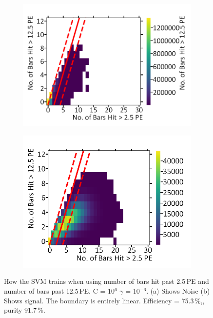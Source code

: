 \begin{figure}[!h]
\centering
\begin{subfigure}{.5\textwidth}
  \centering
  \includegraphics[width=\linewidth]{Appendix1/Figs/Bars1Bars2Noise.png}
  \captionsetup{width=.9\linewidth}
  \caption{}
  \label{subFig:Bars1Bars2N}
\end{subfigure}%
\begin{subfigure}{.5\textwidth}
  \centering
\includegraphics[width=\linewidth]{Appendix1/Figs/Bars1Bars2Signal.png}
  \captionsetup{width=.9\linewidth}
  \caption{}
  \label{subFig:Bars1Bar2S}
\end{subfigure}
\caption{How the SVM trains when using number of bars hit past 2.5\,PE and number of bars past 12.5\,PE. C = 10$^6$ $\gamma$ = 10$^{-6}$. (a) Shows Noise (b) Shows signal. The boundary is entirely linear. Efficiency = 75.3\,\%,, purity 91.7\,\%.}
\label{fig:Bars1BarsSN}
\end{figure}

